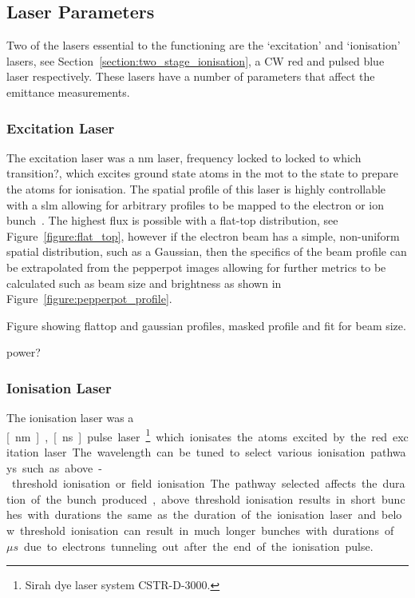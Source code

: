 \subsection{Laser Parameters}
Two of the lasers essential to the functioning are the `excitation' and `ionisation' lasers, see Section~\ref{section:two_stage_ionisation}, a CW red and pulsed blue laser respectively.
These lasers have a number of parameters that affect the emittance measurements.

\subsubsection{Excitation Laser}
The excitation laser was a \unit[780]{nm} laser, frequency locked to {\color{red} locked to which transition?}, which excites ground state atoms in the \gls{mot} to the {\color{red} state} to prepare the atoms for ionisation.
The spatial profile of this laser is highly controllable with a \gls{slm} allowing for arbitrary profiles to be mapped to the electron or ion bunch~\cite{mcculloch_arbitrarily_2011}.
The highest flux is possible with a flat-top distribution, see Figure~\ref{figure:flat_top}, however if the electron beam has a simple, non-uniform spatial distribution, such as a Gaussian, then the specifics of the beam profile can be extrapolated from the pepperpot images allowing for further metrics to be calculated such as beam size and brightness as shown in Figure~\ref{figure:pepperpot_profile}.

{\color{red}Figure showing flattop and gaussian profiles, masked profile and fit for beam size.}

power?

\subsubsection{Ionisation Laser}
The ionisation laser was a \unit[457-493][nm], \unit[10][ns] pulse laser\footnote{Sirah dye laser system CSTR-D-3000.} which ionisates the atoms excited by the red excitation laser.
The wavelength can be tuned to select various ionisation pathways such as above-threshold ionisation or field ionisation.
The pathway selected affects the duration of the bunch produced, above threshold ionisation results in short bunches with durations the same as the duration of the ionisation laser and below threshold ionisation can result in much longer bunches with durations of \unit[10s]{$\mu s$} due to electrons tunneling out after the end of the ionisation pulse.

